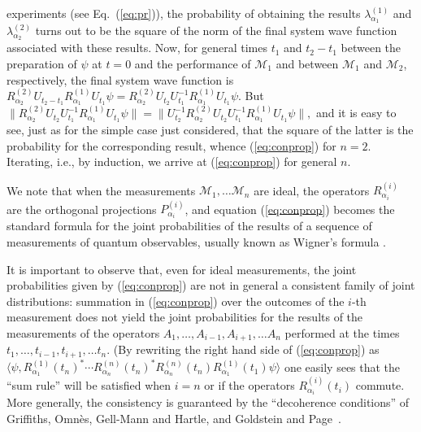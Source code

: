 \documentclass[12pt]{article}
\newcommand{\eq}[1]{(\ref{#1})}
\newcommand{\wf}{wave function}
\newcommand{\M}{\mbox{$\mathcal{M}$}}
\begin{document}
experiments (see Eq.~\eq{eq:pr}), the probability of obtaining the
results $\lambda^{(1)}_{\alpha_{1}}$ and $\lambda^{(2)}_{\alpha_{2}}$
turns out to be the square of the norm of the final system \wf{}
associated with these results.  Now, for general times $t_{1}$ and
$t_{2}-t_{1}$ between the preparation of $\psi$ at $t=0$ and the
performance of $\M_{1}$ and between $\M_{1}$ and $\M_{2}$,
respectively, the final system \wf{} is
\begin{math}
   R^{(2)}_{\alpha_{2}} U_{t_{2}-t_{1}}
   R^{(1)}_{\alpha_{1}}U_{t_{1}}\psi= R^{(2)}_{\alpha_{2}}U_{t_{2}}
   U^{-1}_{t_{1}} R^{(1)}_{\alpha_{1}} U_{t_{1}}\psi.
\end{math}
But
\begin{math}
   \|R^{(2)}_{\alpha_{2}} U_{t_{2}}U^{-1}_{t_{1}} R^{(1)}_{\alpha_{1}}
   U_{t_{1}}\psi\|= \|U^{-1}_{t_{2}}R^{(2)}_{\alpha_{2}}
   U_{t_{2}}U^{-1}_{t_{1}}R^{(1)}_{\alpha_{1}}U_{t_{1}}\psi\| ,
\end{math}
and it is easy to see, just as for the simple case just considered,
that the square of the latter is the probability for the corresponding
result, whence (\ref{eq:conprop}) for $n=2$.  Iterating, i.e., by
induction, we arrive at (\ref{eq:conprop}) for general $n$.

We note that when the measurements $\M_{1},\ldots \M_{n}$ are ideal,
the operators $R^{(i)}_{\alpha_{i}}$ are the orthogonal projections
$P^{(i)}_{\alpha_{i}}$, and equation (\ref{eq:conprop}) becomes the
standard formula for the joint probabilities of the results of a
sequence of measurements of quantum observables, usually known as
Wigner's formula \cite{Wig63}.

It is important to observe that, even for ideal measurements, the
joint probabilities given by (\ref{eq:conprop}) are not in general a
consistent family of joint distributions: summation in
(\ref{eq:conprop}) over the outcomes of the $i$-th measurement does
not yield the joint probabilities for the results of the measurements
of the operators
\begin{math}
   A_{1}, \ldots, A_{i-1},A_{i+1},\ldots A_{n}
\end{math}
performed at the times $t_{1}, \ldots, t_{i-1}, t_{i+1}, \ldots
t_{n}$.  (By rewriting the right hand side of (\ref{eq:conprop}) as
%
\begin{math}
   \langle \psi, R^{(1)}_{\alpha_{1}}(t_{n})^\ast \cdots
   R^{(n)}_{\alpha_{n}} (t_{n})^\ast R^{(n)}_{\alpha_{n}}(t_{n})
   R^{(1)}_{\alpha_{1}}(t_{1}) \psi\rangle
\end{math}
%
one easily sees that the ``sum rule'' will be satisfied when $i=n$ or
if the operators $ R^{(i)}_{\alpha_{i}}(t_{i})$ commute. More
generally, the consistency is guaranteed by the ``decoherence
conditions'' of Griffiths, Omn\`es, Gell-Mann and Hartle, and
Goldstein and Page~\cite{Gri84, GMH90, GoldPage}.
\end{document}
